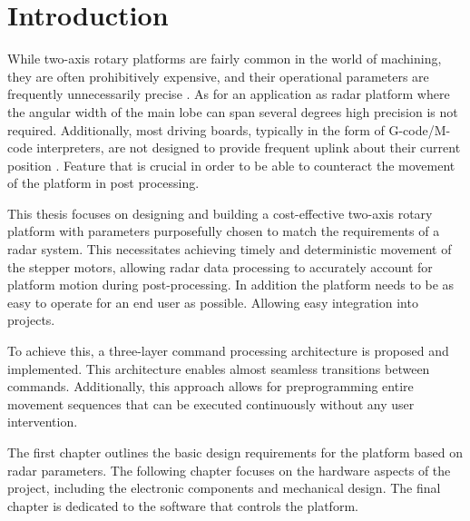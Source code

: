 
\chapter*{Introduction}

While two-axis rotary platforms are fairly common in the world of machining, they are often prohibitively expensive, and their operational parameters are frequently unnecessarily precise \cite{carl}.
As for an application as radar platform where the angular width of the main lobe can span several degrees \cite{sidarMAN} high precision is not required.
Additionally, most driving boards, typically in the form of G-code/M-code interpreters, are not designed to provide frequent uplink about their current position \cite{duet}.
Feature that is crucial in order to be able to counteract the movement of the platform in post processing.

This thesis focuses on designing and building a cost-effective two-axis rotary platform with parameters purposefully chosen to match the requirements of a radar system.
This necessitates achieving timely and deterministic movement of the stepper motors, allowing radar data processing to accurately account for platform motion during post-processing.
In addition the platform needs to be as easy to operate for an end user as possible.
Allowing easy integration into projects.

To achieve this, a three-layer command processing architecture is proposed and implemented.
This architecture enables almost seamless transitions between commands.
Additionally, this approach allows for preprogramming entire movement sequences that can be executed continuously without any user intervention.

The first chapter  outlines the basic design requirements for the platform based on radar parameters.
The following chapter focuses on the hardware aspects of the project, including the electronic components and mechanical design.
The final chapter is dedicated to the software that controls the platform.
